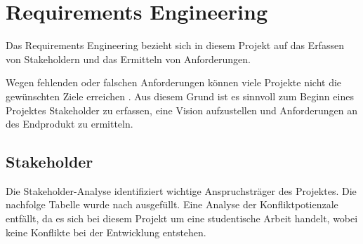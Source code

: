 \chapter{Requirements Engineering}
\label{ch:requirements}

Das Requirements Engineering bezieht sich in diesem Projekt auf das Erfassen von Stakeholdern und das Ermitteln von Anforderungen.

Wegen fehlenden oder falschen Anforderungen können viele Projekte nicht die gewünschten Ziele
erreichen \cite[S.~4-9]{Ebert:SystematischesReqEng}. Aus diesem Grund ist es sinnvoll zum Beginn eines Projektes Stakeholder zu erfassen,
eine Vision aufzustellen und Anforderungen an des Endprodukt zu ermitteln.


\section{Stakeholder}
\label{sec:stakeholder}

Die Stakeholder-Analyse identifiziert wichtige Anspruchsträger des Projektes.
Die nachfolge Tabelle wurde nach \cite[S.~58-60]{Ebert:SystematischesReqEng} ausgefüllt.
Eine Analyse der Konfliktpotienzale entfällt, da es sich bei diesem Projekt um eine studentische Arbeit handelt, wobei keine Konflikte bei
der Entwicklung entstehen.

